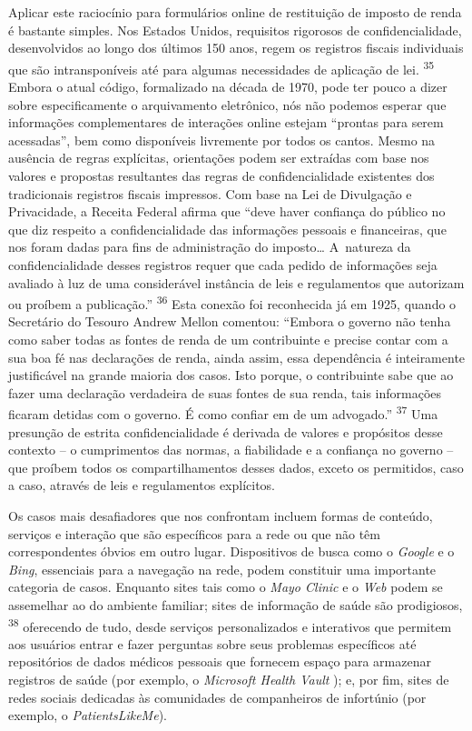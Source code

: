 Aplicar este raciocínio para formulários online de restituição de
imposto de renda é bastante simples. Nos Estados Unidos, requisitos
rigorosos de confidencialidade, desenvolvidos ao longo dos últimos 150
anos, regem os registros fiscais individuais que são intransponíveis até
para algumas necessidades de aplicação de lei. \textsuperscript{{35}}
Embora o atual código, formalizado na década de 1970, pode ter pouco a
dizer sobre especificamente o arquivamento eletrônico, nós não podemos
esperar que informações complementares de interações online estejam
``prontas para serem acessadas'', bem como disponíveis livremente por
todos os cantos. Mesmo na ausência de regras explícitas, orientações
podem ser extraídas com base nos valores e propostas resultantes das
regras de confidencialidade existentes dos tradicionais registros
fiscais impressos. Com base na Lei de Divulgação e Privacidade, a
Receita Federal afirma que ``deve haver confiança do público no que diz
respeito a confidencialidade das informações pessoais e financeiras, que
nos foram dadas para fins de administração do imposto\ldots{} A~natureza da
confidencialidade desses registros requer que cada pedido de informações
seja avaliado à luz de uma considerável instância de leis e regulamentos
que autorizam ou proíbem a publicação.'' \textsuperscript{{36}} Esta
conexão foi reconhecida já em 1925, quando o Secretário do Tesouro
Andrew Mellon comentou: ``Embora o governo não tenha como saber todas as
fontes de renda de um contribuinte e precise contar com a sua boa fé nas
declarações de renda, ainda assim, essa dependência é inteiramente
justificável na grande maioria dos casos. Isto porque, o contribuinte
sabe que ao fazer uma declaração verdadeira de suas fontes de sua renda,
tais informações ficaram detidas com o governo. É como confiar em de um
advogado.'' \textsuperscript{{37}} Uma presunção de estrita
confidencialidade é derivada de valores e propósitos desse contexto -- o
cumprimentos das normas, a fiabilidade e a confiança no governo -- que
proíbem todos os compartilhamentos desses dados, exceto os permitidos,
caso a caso, através de leis e regulamentos explícitos.

Os casos mais desafiadores que nos confrontam incluem formas de
conteúdo, serviços e interação que são específicos para a rede ou que
não têm correspondentes óbvios em outro lugar. Dispositivos de busca
como o \emph{Google} e o \emph{Bing}, essenciais para a navegação na
rede, podem constituir uma importante categoria de casos. Enquanto sites
tais como o \emph{Mayo Clinic} e o \emph{Web} podem se assemelhar ao
do ambiente familiar; sites de informação de saúde são prodigiosos,
\textsuperscript{{38}} oferecendo de tudo, desde serviços personalizados
e interativos que permitem aos usuários entrar e fazer perguntas sobre
seus problemas específicos até repositórios de dados médicos pessoais
que fornecem espaço para armazenar registros de saúde (por exemplo, o
\emph{Microsoft Health Vault} ); e, por fim, sites de redes sociais
dedicadas às comunidades de companheiros de infortúnio (por exemplo, o
\emph{PatientsLikeMe}).

